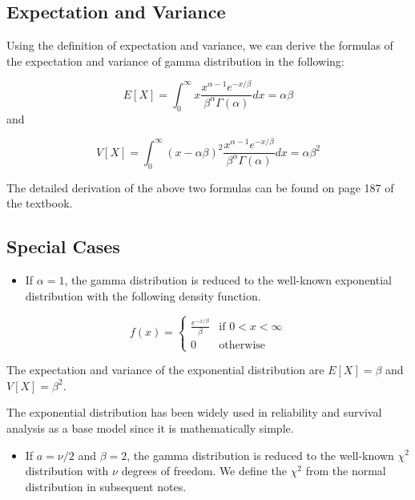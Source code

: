 \documentclass[
]{book}
\providecommand{\tightlist}{%
  \setlength{\itemsep}{0pt}\setlength{\parskip}{0pt}}
\begin{document}
\hfill\break

\hypertarget{expectation-and-variance-2}{%
\subsection{Expectation and Variance}\label{expectation-and-variance-2}}

Using the definition of expectation and variance, we can derive the formulas of the expectation and variance of gamma distribution in the following:

\[
E[X] = \int_0^\infty x \frac{x^{\alpha-1}e^{-x/\beta}}{\beta^\alpha\Gamma(\alpha)} dx = \alpha\beta
\]
and

\[
V[X] = \int_0^\infty (x-\alpha\beta)^2 \frac{x^{\alpha-1}e^{-x/\beta}}{\beta^\alpha\Gamma(\alpha)} dx = \alpha\beta^2
\]

The detailed derivation of the above two formulas can be found on page 187 of the textbook.

\hfill\break

\hypertarget{special-cases-1}{%
\subsection{Special Cases}\label{special-cases-1}}

\begin{itemize}
\tightlist
\item
  If \(\alpha = 1\), the gamma distribution is reduced to the well-known exponential distribution with the following density function.
\end{itemize}

\[
\displaystyle f(x) = \begin{cases} 
 \frac{e^{-x/\beta}}{\beta} & \text{if $0 < x < \infty$} \\  
 0 & \text{otherwise}  
 \end{cases}
\]

The expectation and variance of the exponential distribution are \(E[X] = \beta\) and \(V[X] = \beta^2\).

The exponential distribution has been widely used in reliability and survival analysis as a base model since it is mathematically simple.

\begin{itemize}
\tightlist
\item
  If \(a = \nu/2\) and \(\beta = 2\), the gamma distribution is reduced to the well-known \(\chi^2\) distribution with \(\nu\) degrees of freedom. We define the \(\chi^2\) from the normal distribution in subsequent notes.
\end{itemize}
\end{document}
